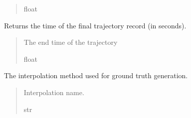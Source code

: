 \documentclass[letterpaper,10pt,english]{sphinxmanual}
\begin{document}
\begin{fulllineitems}
\begin{fulllineitems}
\begin{quote}
\begin{description}
\sphinxAtStartPar
float

\end{description}\end{quote}

\end{fulllineitems}


\begin{fulllineitems}
\label{\detokenize{modules/waypoints/trajectory:qnav.waypoints.trajectory.Trajectory.end_time}}
\pysigstartsignatures
{}
\pysigstopsignatures
\sphinxAtStartPar
Returns the time of the final trajectory record (in seconds).
\begin{quote}\begin{description}
\sphinxAtStartPar
The end time of the trajectory

\sphinxAtStartPar
float

\end{description}\end{quote}

\end{fulllineitems}


\begin{fulllineitems}
\label{\detokenize{modules/waypoints/trajectory:qnav.waypoints.trajectory.Trajectory.interp_method}}
\pysigstartsignatures
{}
\pysigstopsignatures
\sphinxAtStartPar
The interpolation method used for ground truth generation.
\begin{quote}\begin{description}
\sphinxAtStartPar
Interpolation name.

\sphinxAtStartPar
str

\end{description}\end{quote}

\end{fulllineitems}


\end{fulllineitems}
\end{document}
